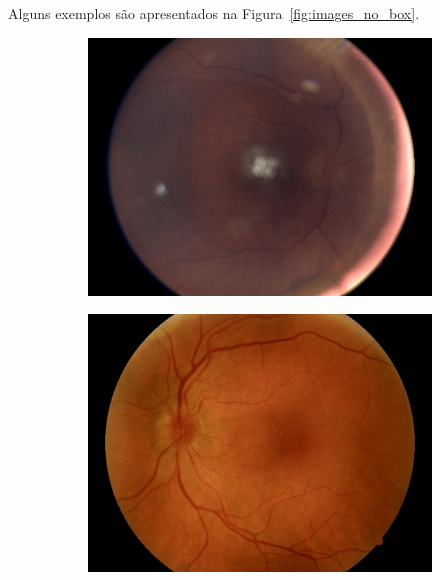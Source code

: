 \documentclass[12pt]{article}
\begin{document}
Alguns exemplos são apresentados na Figura~\ref{fig:images_no_box}.

\begin{figure}
    \centering
    \begin{subfigure}[b]{0.47\textwidth}
        \centering
        \includegraphics[width=\textwidth]{images/no_box/TRAIN000883_boxes.jpg}
        \label{fig:images_no_box_1}
    \end{subfigure}
    \hfill
    \begin{subfigure}[b]{0.47\textwidth}
        \centering
        \includegraphics[width=\textwidth]{images/no_box/TRAIN045856_boxes.jpg}
        \label{fig:images_no_box_2}
    \end{subfigure}

\end{figure}
\end{document}
